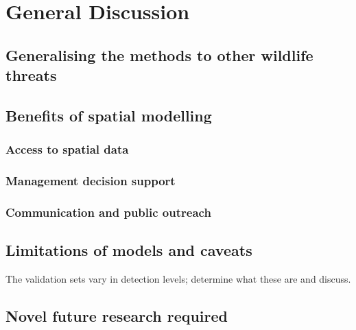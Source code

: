 \chapter{General Discussion}\label{sec:conc}
\newpage

\section{Generalising the methods to other wildlife threats}


\section{Benefits of spatial modelling}

\subsection{Access to spatial data}

\subsection{Management decision support}

\subsection{Communication and public outreach}

\section{Limitations of models and caveats}

The validation sets vary in detection levels; determine what these are and discuss.



\section{Novel future research required}

